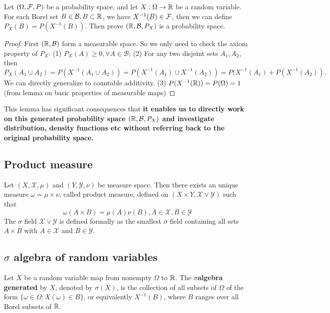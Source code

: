 \begin{refsection}
\begin{lemma}
Let $(\Omega,\mathcal{F},P)$ be a probability space, and let $X:\Omega \rightarrow \mathbb{R}$ be a random variable. For each Borel set $B\in \mathcal{B},B\subset \mathbb{R}$, we have $X^{-1}(B)\in \mathcal{F}$, then we can define $P_X(B) = P(X^{-1}(B))$.
Then prove  $(\mathbb{R},\mathcal{B},P_X)$ is a probability space.
	
\end{lemma}
\begin{proof}
First $(\mathbb{R},\mathcal{B})$ form a measurable space. So we only need to check the axiom property of $P_X$: (1) $P_X(A)\geq 0,\forall A\in \mathcal{B}$; (2) For any two disjoint sets $A_1,A_2$, then $$P_X(A_1\cup A_2) = P(X^{-1}(A_1\cup A_2)) =P(X^{-1}(A_1)\cup X^{-1}(A_2)) = P(X^{-1}(A_1)+ P(X^{-1}(A_2)). $$
We can directly generalize to countable additivity. (3) $P(X^{-1}(\mathbb{R})) = P(\Omega)=1$(from lemma on basic properties of measurable maps)
\end{proof}



\begin{remark}
This lemma has significant consequences that \textbf{it enables us to directly work on this generated probability space $(\mathbb{R},\mathcal{B},P_X)$ and investigate distribution, density functions etc without referring back to the original probability space. }
\end{remark}


\subsection{Product measure}
\begin{definition}\cite{keener2010theoretical}
	Let $(X,\mathcal{X},\mu)$ and $(Y,\mathcal{Y},\nu)$ be measure space. Then there exists an unique measure $\omega = \mu\times \nu$, called product measure, defined on $(X\times Y,\mathcal{X}\vee \mathcal{Y})$ such that 
	$$\omega(A\times B) = \mu(A)\nu(B),A\in \mathcal{X},B\in \mathcal{Y}$$
	The $\sigma$ field $\mathcal{X}\vee \mathcal{Y}$ is defined formally as the smallest $\sigma$ field containing all sets $A\times B$ with $A\in \mathcal{X}$ and $B\in \mathcal{Y}$.
\end{definition}


\subsection{$\sigma$ algebra of random variables}
\begin{definition}\cite[52]{shreve2004stochastic2}\label{ch:theory-of-probability:def:sigmaAlgebraGeneratedByRandomVariable}
	Let $X$ be a random variable map from nonempty $\Omega$ to $\mathbb{R}$. The $\sigma$\textbf{algebra generated} by $X$, denoted by $\sigma(X)$, is the collection of all subsets of $\Omega$ of the form $\{\omega \in \Omega: X(\omega) \in B \}$, or equivalently $X^{-1}(B)$, where $B$ ranges over all Borel subsets of $\mathbb{R}$.
\end{definition}


\end{refsection}
